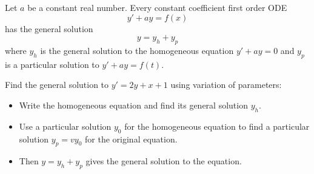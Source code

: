 \begin{applicationActivities}
\begin{fact}
Let \(a\) be a constant real number.
Every constant coefficient first order ODE
\[y'+ay=f(x)\]
has the general solution
\[y=y_h+y_p\]
where \(y_h\) is the general solution to the homogeneous equation \(y'+ay=0\)
and \(y_p\) is a particular solution to \(y'+ay=f(t)\).
\end{fact}

\begin{activity}{15}
Find the general solution to \(y'=2y+x+1\) using variation of parameters:

\vfill

\begin{itemize}
\item Write the homogeneous equation and find its general solution \(y_h\).
\item Use a particular solution \(y_0\) for the homogeneous equation to find a particular solution
      \(y_p=vy_0\) for the original equation.
\item Then \(y=y_h+y_p\) gives the general solution to the equation.
\end{itemize}
\end{activity}

\end{applicationActivities}
